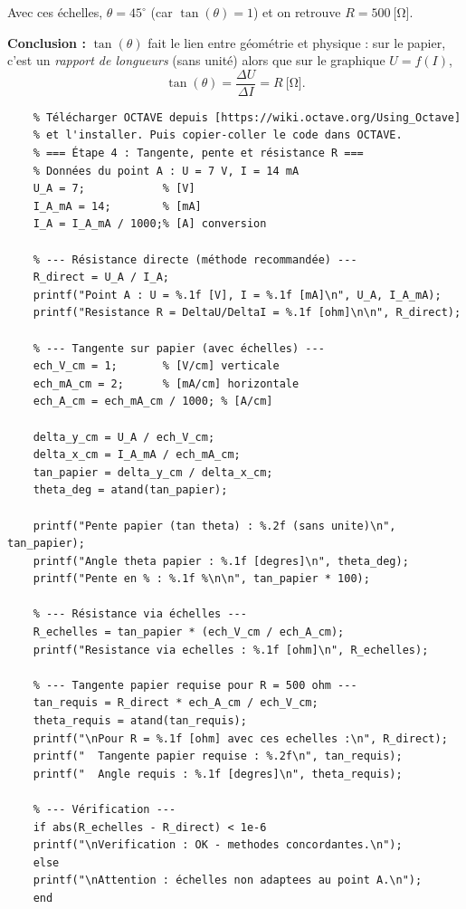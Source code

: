 \documentclass[a4paper,11pt,answers,addpoints]{exam}
\begin{document}
\begin{questions}
\begin{solution}
Avec ces échelles, $\theta = 45^\circ$ (car $\tan(\theta) = 1$) et on retrouve $R = 500\ \unit{[\ohm]}$.

\medskip
\textbf{Conclusion :} $\tan(\theta)$ fait le lien entre géométrie et physique :
sur le papier, c’est un \emph{rapport de longueurs} (sans unité) alors que sur le graphique $U = f(I)$,
\[
\tan(\theta) = \frac{\Delta U}{\Delta I} = R\ \unit{[\ohm]}.
\]

\vspace{0.5em}
\begin{verbatim}
	% Télécharger OCTAVE depuis [https://wiki.octave.org/Using_Octave]
	% et l'installer. Puis copier-coller le code dans OCTAVE.
	% === Étape 4 : Tangente, pente et résistance R ===
	% Données du point A : U = 7 V, I = 14 mA
	U_A = 7;            % [V]
	I_A_mA = 14;        % [mA]
	I_A = I_A_mA / 1000;% [A] conversion
	
	% --- Résistance directe (méthode recommandée) ---
	R_direct = U_A / I_A;
	printf("Point A : U = %.1f [V], I = %.1f [mA]\n", U_A, I_A_mA);
	printf("Resistance R = DeltaU/DeltaI = %.1f [ohm]\n\n", R_direct);
	
	% --- Tangente sur papier (avec échelles) ---
	ech_V_cm = 1;       % [V/cm] verticale
	ech_mA_cm = 2;      % [mA/cm] horizontale
	ech_A_cm = ech_mA_cm / 1000; % [A/cm]
	
	delta_y_cm = U_A / ech_V_cm;
	delta_x_cm = I_A_mA / ech_mA_cm;
	tan_papier = delta_y_cm / delta_x_cm;
	theta_deg = atand(tan_papier);
	
	printf("Pente papier (tan theta) : %.2f (sans unite)\n", tan_papier);
	printf("Angle theta papier : %.1f [degres]\n", theta_deg);
	printf("Pente en % : %.1f %\n\n", tan_papier * 100);
	
	% --- Résistance via échelles ---
	R_echelles = tan_papier * (ech_V_cm / ech_A_cm);
	printf("Resistance via echelles : %.1f [ohm]\n", R_echelles);
	
	% --- Tangente papier requise pour R = 500 ohm ---
	tan_requis = R_direct * ech_A_cm / ech_V_cm;
	theta_requis = atand(tan_requis);
	printf("\nPour R = %.1f [ohm] avec ces echelles :\n", R_direct);
	printf("  Tangente papier requise : %.2f\n", tan_requis);
	printf("  Angle requis : %.1f [degres]\n", theta_requis);
	
	% --- Vérification ---
	if abs(R_echelles - R_direct) < 1e-6
	printf("\nVerification : OK - methodes concordantes.\n");
	else
	printf("\nAttention : échelles non adaptees au point A.\n");
	end		
\end{verbatim}

\end{solution}
\end{questions}
\end{document}
